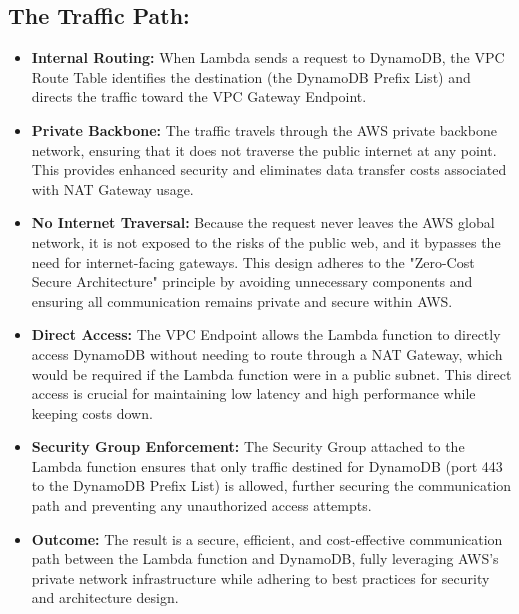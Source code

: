 \subsection{The Traffic Path:}
\begin{itemize}
  \item \textbf{Internal Routing:} When Lambda sends a request to DynamoDB, the VPC Route Table identifies the destination (the DynamoDB Prefix List) and directs the traffic toward the VPC Gateway Endpoint.
  \item \textbf{Private Backbone:} The traffic travels through the AWS private backbone network, ensuring that it does not traverse the public internet at any point. This provides enhanced security and eliminates data transfer costs associated with NAT Gateway usage.
  \item \textbf{No Internet Traversal:} Because the request never leaves the AWS global network, it is not exposed to the risks of the public web, and it bypasses the need for internet-facing gateways. This design adheres to the "Zero-Cost Secure Architecture" principle by avoiding unnecessary components and ensuring all communication remains private and secure within AWS.
  \item \textbf{Direct Access:} The VPC Endpoint allows the Lambda function to directly access DynamoDB without needing to route through a NAT Gateway, which would be required if the Lambda function were in a public subnet. This direct access is crucial for maintaining low latency and high performance while keeping costs down.
  \item \textbf{Security Group Enforcement:} The Security Group attached to the Lambda function ensures that only traffic destined for DynamoDB (port 443 to the DynamoDB Prefix List) is allowed, further securing the communication path and preventing any unauthorized access attempts.
  \item \textbf{Outcome:} The result is a secure, efficient, and cost-effective communication path between the Lambda function and DynamoDB, fully leveraging AWS's private network infrastructure while adhering to best practices for security and architecture design.
\end{itemize}

